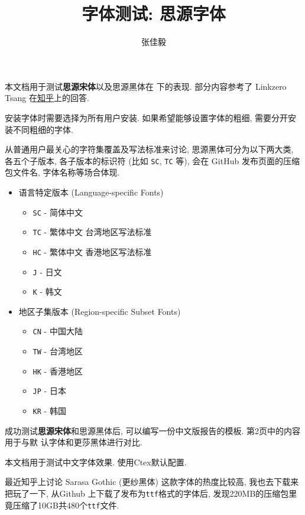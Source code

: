 \documentclass{article}
\title{字体测试: 思源字体}
\author{张佳毅}
\date{}
\begin{document}
\maketitle

本文档用于测试\textbf{思源宋体}以及\textsf{思源黑体}在 \LaTeXe 下的表现. 部分内容参考了 Linkzero Tsang 在\href{https://zhuanlan.zhihu.com/p/526734630?utm\_medium=social&utm\_oi=31733521055744&eqid=d1b
f141c000036db00000002649474da}{知乎}上的回答.

安装字体时需要选择为所有用户安装. 如果希望能够设置字体的粗细, 需要分开安装不同粗细的字体.

从普通用户最关心的字符集覆盖及写法标准来讨论, 思源黑体可分为以下两大类, 各五个子版本, 各子版本的标识符 (比如 
\texttt{SC}, \texttt{TC} 等), 会在 GitHub 发布页面的压缩包文件名, 字体名称等场合体现.
\begin{itemize}
	\item 语言特定版本 (Language-specific Fonts)
	      \begin{itemize}
	      	\item \texttt{SC} - 简体中文
	      	\item \texttt{TC} - 繁体中文 台湾地区写法标准
	      	\item \texttt{HC} - 繁体中文 香港地区写法标准
	      	\item \texttt{J} - 日文
	      	\item \texttt{K} - 韩文
	      \end{itemize}
	\item 地区子集版本 (Region-specific Subset Fonts)
	       \begin{itemize}
	      	\item \texttt{CN} - 中国大陆
	      	\item \texttt{TW} - 台湾地区
	      	\item \texttt{HK} - 香港地区
	      	\item \texttt{JP} - 日本
	      	\item \texttt{KR} - 韩国
	      \end{itemize}
\end{itemize}

成功测试\textbf{思源宋体}和\textsf{思源黑体}后, 可以编写一份中文版报告的模板. 第2页中的内容用于与默
认字体和更莎黑体进行对比.

\newpage

本文档用于测试中文字体效果. 使用Ctex默认配置.

最近知乎上讨论 Sarasa Gothic (更纱黑体) 这款字体的热度比较高, 我也去下载来把玩了一下, 从Github
上下载了发布为\texttt{ttf}格式的字体后, 发现220MB的压缩包里竟压缩了10GB共480个\texttt{ttf}文件.
\end{document}
